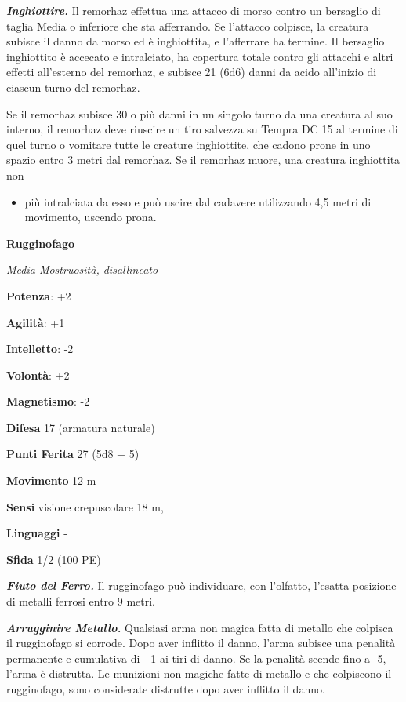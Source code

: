 \begin{multicols}{2}
\emph{\textbf{Inghiottire.}} Il remorhaz effettua una attacco di morso
contro un bersaglio di taglia Media o inferiore che sta afferrando. Se
l'attacco colpisce, la creatura subisce il danno da morso ed è
inghiottita, e l'afferrare ha termine. Il bersaglio inghiottito è
accecato e intralciato, ha copertura totale contro gli attacchi e altri
effetti all'esterno del remorhaz, e subisce 21 (6d6) danni da acido
all'inizio di ciascun turno del remorhaz.

Se il remorhaz subisce 30 o più danni in un singolo turno da una
creatura al suo interno, il remorhaz deve riuscire un tiro salvezza su Tempra DC 15 al termine di quel turno o vomitare tutte le creature
inghiottite, che cadono prone in uno spazio entro 3 metri dal remorhaz.
Se il remorhaz muore, una creatura inghiottita non


\begin{itemize}
\item
  più intralciata da esso e può uscire dal cadavere utilizzando 4,5
  metri di movimento, uscendo prona.
\end{itemize}

\textbf{Rugginofago}

\emph{Media Mostruosità, disallineato}

\textbf{Potenza}: +2

\textbf{Agilità}: +1

\textbf{Intelletto}: -2

\textbf{Volontà}: +2

\textbf{Magnetismo}: -2

\textbf{Difesa} 17 (armatura naturale)

\textbf{Punti Ferita} 27 (5d8 + 5)

\textbf{Movimento} 12 m

\textbf{Sensi} visione crepuscolare 18 m, 

\textbf{Linguaggi} -

\textbf{Sfida} 1/2 (100 PE)\smallskip

\emph{\textbf{Fiuto del Ferro.}} Il rugginofago può individuare, con
l'olfatto, l'esatta posizione di metalli ferrosi entro 9 metri.

\emph{\textbf{Arrugginire Metallo.}} Qualsiasi arma non magica fatta di
metallo che colpisca il rugginofago si corrode. Dopo aver inflitto il
danno, l'arma subisce una penalità permanente e cumulativa di - 1 ai
tiri di danno. Se la penalità scende fino a -5, l'arma è distrutta. Le
munizioni non magiche fatte di metallo e che colpiscono il rugginofago,
sono considerate distrutte dopo aver inflitto il danno.


\end{multicols}
